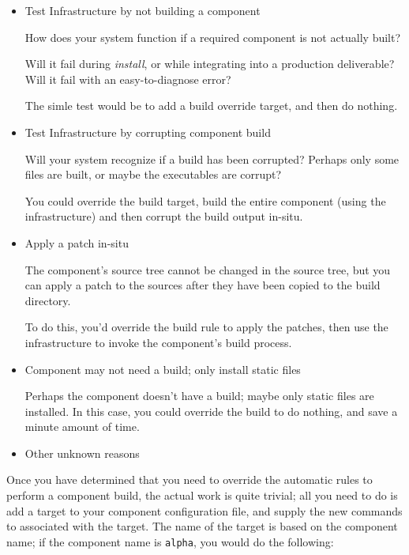 \begin{itemize}
\item Test \bni Infrastructure by not building a component

  How does your \bni system function if a required component is not
  actually built?

  Will it fail during \emph{install}, or while integrating into a
  production deliverable?  Will it fail with an easy-to-diagnose
  error?

  The simle test would be to add a build override target, and then do
  nothing.

\item Test \bni Infrastructure by corrupting component build

  Will your \bni system recognize if a build has been corrupted?
  Perhaps only some files are built, or maybe the executables are
  corrupt?

  You could override the build target, build the entire component
  (using the \lmsbw infrastructure) and then corrupt the build output
  in-situ.

\item Apply a patch in-situ

  The component's source tree cannot be changed in the source tree,
  but you can apply a patch to the sources after they have been copied to the build
  directory.

  To do this, you'd override the build rule to apply the patches, then
  use the \lmsbw infrastructure to invoke the component's build
  process.

\item Component may not need a build; only install static files

  Perhaps the component doesn't have a build; maybe only static files
  are installed.  In this case, you could override the build to do
  nothing, and save a minute amount of time.

\item Other unknown reasons
\end{itemize}

Once you have determined that you need to override the automatic rules
to perform a component build, the actual work is quite trivial; all
you need to do is add a \makefile target to your component
configuration file, and supply the new commands to associated with the
target.  The name of the target is based on the component name; if the
component name is \texttt{alpha}, you would do the following:

